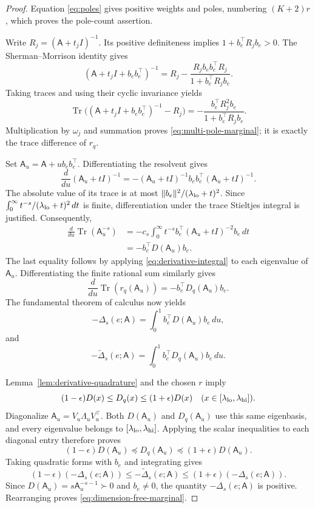 \documentclass[conference]{IEEEtran}
\theoremstyle{definition}
\DeclareMathOperator{\Tr}{Tr}
\newcommand{\matA}{\mathsf A}
\begin{document}
\begin{proof}
Equation \eqref{eq:poles} gives positive weights and poles, numbering $(K+2)r$, which proves the pole-count assertion.

Write $R_j=({\matA}+t_jI)^{-1}$. Its positive definiteness implies $1+b_e^\top R_jb_e>0$. The Sherman--Morrison identity gives
\[
({\matA}+t_jI+b_eb_e^\top)^{-1}
=R_j-\frac{R_jb_eb_e^\top R_j}{1+b_e^\top R_jb_e}.
\]
Taking traces and using their cyclic invariance yields
\[
\Tr\bigl(({\matA}+t_jI+b_eb_e^\top)^{-1}-R_j\bigr)
=-\frac{b_e^\top R_j^2b_e}{1+b_e^\top R_jb_e}.
\]
Multiplication by $\omega_j$ and summation proves \eqref{eq:multi-pole-marginal}; it is exactly the trace difference of $r_q$.

Set ${\matA}_u={\matA}+u b_eb_e^\top$. Differentiating the resolvent gives
\[
\frac{d}{du}({\matA}_u+t I)^{-1}
=-({\matA}_u+t I)^{-1}b_eb_e^\top({\matA}_u+t I)^{-1}.
\]
The absolute value of its trace is at most $\|b_e\|^2/({\lambda_{\rm lo}}+t)^2$. Since $\int_0^\infty{ t}^{-s}/({\lambda_{\rm lo}}+t)^2\,dt$ is finite, differentiation under the trace Stieltjes integral is justified. Consequently,
\begin{align*}
\frac{d}{du}\Tr({\matA}_u^{-s})
&=-c_s\int_0^\infty{ t}^{-s}
b_e^\top({\matA}_u+t I)^{-2}b_e\,dt\\
&=-b_e^\top D({\matA}_u)b_e.
\end{align*}
The last equality follows by applying \eqref{eq:derivative-integral} to each eigenvalue of ${\matA}_u$. Differentiating the finite rational sum similarly gives
\[
\frac{d}{du}\Tr(r_q({\matA}_u))=-b_e^\top D_q({\matA}_u)b_e.
\]
The fundamental theorem of calculus now yields
\[
-\Delta_s(e;{\matA})=\int_0^1b_e^\top D({\matA}_u)b_e\,du,
\]
and
\[
-\widetilde\Delta_s(e;{\matA})=\int_0^1b_e^\top D_q({\matA}_u)b_e\,du.
\]

Lemma~\ref{lem:derivative-quadrature} and the chosen $r$ imply
\[
(1-\epsilon)D(x)\le D_q(x)\le(1+\epsilon)D(x)
\quad(x\in[\lambda_{\rm lo},\lambda_{\rm hi}]).
\]
Diagonalize ${\matA}_u=V_u\Lambda_uV_u^\top$. Both $D({\matA}_u)$ and $D_q({\matA}_u)$ use this same eigenbasis, and every eigenvalue belongs to $[\lambda_{\rm lo},\lambda_{\rm hi}]$. Applying the scalar inequalities to each diagonal entry therefore proves
\[
(1-\epsilon)D({\matA}_u)\preceq D_q({\matA}_u)
\preceq(1+\epsilon)D({\matA}_u).
\]
Taking quadratic forms with $b_e$ and integrating gives
\[
(1-\epsilon)(-\Delta_s(e;{\matA}))
\le-\widetilde\Delta_s(e;{\matA})
\le(1+\epsilon)(-\Delta_s(e;{\matA})).
\]
Since $D({\matA}_u)=s{\matA}_u^{-s-1}\succ0$ and $b_e\ne0$, the quantity $-\Delta_s(e;{\matA})$ is positive. Rearranging proves \eqref{eq:dimension-free-marginal}.
\end{proof}
\end{document}
